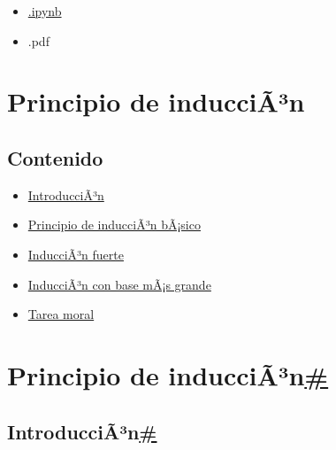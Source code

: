 \label{main-content}
{}

\emph{}

\begin{itemize}
\tightlist
\item
  \href{../_sources/P1/Induccion.ipynb}{{ \emph{} } {.ipynb}}
\item
  { \emph{} } {.pdf}
\end{itemize}

{ \emph{} }

{}

\label{jb-print-docs-body}
\section{Principio de inducciÃ³n}\label{principio-de-inducciuxe3uxb3n}

\label{print-main-content}
\label{jb-print-toc}
\subsection{Contenido}\label{contenido}

\begin{itemize}
\tightlist
\item
  \hyperref[introduccion]{IntroducciÃ³n}
\item
  \hyperref[principio-de-induccion-basico]{Principio de inducciÃ³n
  bÃ¡sico}
\item
  \hyperref[induccion-fuerte]{InducciÃ³n fuerte}
\item
  \hyperref[induccion-con-base-mas-grande]{InducciÃ³n con base mÃ¡s
  grande}
\item
  \hyperref[tarea-moral]{Tarea moral}
\end{itemize}

\label{searchbox}

\label{principio-de-induccion}
\section{\texorpdfstring{Principio de
inducciÃ³n\hyperref[principio-de-induccion]{\#}}{Principio de inducciÃ³n\#}}\label{principio-de-inducciuxe3uxb3n-1}

\label{introduccion}
\subsection{\texorpdfstring{IntroducciÃ³n\hyperref[introduccion]{\#}}{IntroducciÃ³n\#}}\label{introducciuxe3uxb3n}

